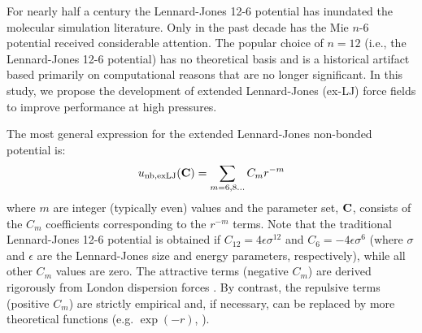 \documentclass[12pt,a4paper]{article}
\newcommand{\bfm}[1]{{\bf #1}}
\newcommand{\C}{\bfm{C}}
\begin{document}






For nearly half a century the Lennard-Jones 12-6 potential has inundated the molecular simulation literature. Only in the past decade has the Mie $n$-6 potential received considerable attention. The popular choice of $n =12$ (i.e., the Lennard-Jones 12-6 potential) has no theoretical basis and is a historical artifact based primarily on computational reasons that are no longer significant. In this study, we propose the development of extended Lennard-Jones (ex-LJ) force fields to improve performance at high pressures. 

The most general expression for the extended Lennard-Jones non-bonded potential is:
\begin{equation} \label{ex-LJ general}
u_{\rm nb, exLJ}(\C) = \sum_{m = 6, 8 ...} C_m r^{-m} 
\end{equation} 
where $m$ are integer (typically even) values and the parameter set, $\C$, consists of the $C_m$ coefficients corresponding to the $r^{-m}$ terms. Note that the traditional Lennard-Jones 12-6 potential is obtained if $C_{12} = 4\epsilon\sigma^{12}$ and $C_6=-4\epsilon\sigma^{6}$ (where $\sigma$ and $\epsilon$ are the Lennard-Jones size and energy parameters, respectively), while all other $C_m$ values are zero. The attractive terms (negative $C_m$) are derived rigorously from London dispersion forces \cite{Stone2013}. By contrast, the repulsive terms (positive $C_m$) are strictly empirical and, if necessary, can be replaced by more theoretical functions (e.g. $\exp(-r)$, \cite{Hellmann2017,Przybytek2017}). 
\end{document}
